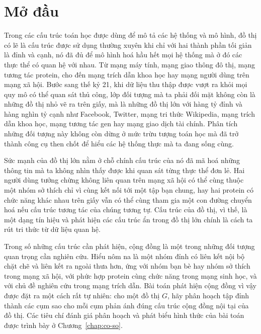 
\chapter*{Mở đầu}

Trong các cấu trúc toán học được dùng để mô tả các hệ thống và mô hình, đồ thị có lẽ là cấu trúc được sử dụng thường xuyên khi chỉ với hai thành phần tối giản là đỉnh và cạnh, nó đã đủ để mô hình hoá hầu hết mọi hệ thống mà ở đó các thực thể có quan hệ với nhau. Từ mạng máy tính, mạng giao thông đô thị, mạng tương tác protein, cho đến mạng trích dẫn khoa học hay mạng người dùng trên mạng xã hội. Bước sang thế kỷ 21, khi dữ liệu thu thập được vượt ra khỏi mọi quy mô có thể quan sát thủ công, lớp đối tượng mà ta phải đối mặt không còn là những đồ thị nhỏ vẽ ra trên giấy, mà là những đồ thị lớn với hàng tỷ đỉnh và hàng nghìn tỷ cạnh như Facebook, Twitter, mạng tri thức Wikipedia, mạng trích dẫn khoa học, mạng tương tác gen hay mạng giao dịch tài chính. Phân tích những đối tượng này không còn dừng ở mức trừu tượng toán học mà đã trở thành công cụ then chốt để hiểu các hệ thống thực mà ta đang sống cùng.

Sức mạnh của đồ thị lớn nằm ở chỗ chính cấu trúc của nó đã mã hoá những thông tin mà ta không nhìn thấy được khi quan sát từng thực thể đơn lẻ. Hai người dùng tưởng chừng không liên quan trên mạng xã hội có thể cùng thuộc một nhóm sở thích chỉ vì cùng kết nối tới một tập bạn chung, hay hai protein có chức năng khác nhau trên giấy vẫn có thể cùng tham gia một con đường chuyển hoá nếu cấu trúc tương tác của chúng tương tự. Cấu trúc của đồ thị, vì thế, là một dạng tín hiệu và phát hiện các cấu trúc ẩn trong đồ thị lớn chính là cách ta rút tri thức từ dữ liệu quan hệ.

Trong số những cấu trúc cần phát hiện, cộng đồng là một trong những đối tượng quan trọng cần nghiên cứu. Hiểu nôm na là một nhóm đỉnh có liên kết nội bộ chặt chẽ và liên kết ra ngoài thưa hơn, ứng với nhóm bạn bè hay nhóm sở thích trong mạng xã hội, với phức hợp protein cùng chức năng trong mạng sinh học, và với chủ đề nghiên cứu trong mạng trích dẫn. Bài toán phát hiện cộng đồng vì vậy được đặt ra một cách rất tự nhiên: cho một đồ thị $G$, hãy phân hoạch tập đỉnh thành các cụm sao cho mỗi cụm phản ánh đúng cấu trúc cộng đồng nội tại của đồ thị. Các tiêu chí đánh giá phân hoạch và phát biểu hình thức của bài toán được trình bày ở Chương~\ref{chap:co-so}.

